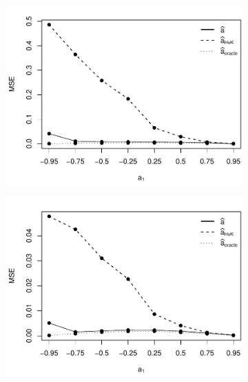 \begin{figure}[t!]
\begin{subfigure}[b]{0.475\textwidth}
\includegraphics[width=\textwidth]{Plots/MSE_a1_T=250_slope=100_(L1,L2,K1,K2,M1,M2)=(25,25,5,10,20,30).pdf}
\end{subfigure}\hspace{0.25cm}
\begin{subfigure}[b]{0.475\textwidth}
\includegraphics[width=\textwidth]{Plots/MSE_a1_T=500_slope=100_(L1,L2,K1,K2,M1,M2)=(25,25,5,10,20,30).pdf}
\end{subfigure}


\end{figure}
